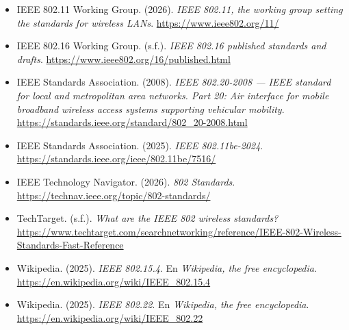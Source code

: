 \documentclass[12pt,letterpaper]{article}
\begin{document}
\begin{itemize}[leftmargin=1.5em,itemsep=8pt]

\item[] IEEE 802.11 Working Group. (2026). \textit{IEEE 802.11, the working group setting the standards for wireless LANs}. \url{https://www.ieee802.org/11/}

\item[] IEEE 802.16 Working Group. (s.f.). \textit{IEEE 802.16 published standards and drafts}. \url{https://www.ieee802.org/16/published.html}

\item[] IEEE Standards Association. (2008). \textit{IEEE 802.20-2008 — IEEE standard for local and metropolitan area networks. Part 20: Air interface for mobile broadband wireless access systems supporting vehicular mobility}. \url{https://standards.ieee.org/standard/802_20-2008.html}

\item[] IEEE Standards Association. (2025). \textit{IEEE 802.11be-2024}. \url{https://standards.ieee.org/ieee/802.11be/7516/}

\item[] IEEE Technology Navigator. (2026). \textit{802 Standards}. \url{https://technav.ieee.org/topic/802-standards/}

\item[] TechTarget. (s.f.). \textit{What are the IEEE 802 wireless standards?} \url{https://www.techtarget.com/searchnetworking/reference/IEEE-802-Wireless-Standards-Fast-Reference}

\item[] Wikipedia. (2025). \textit{IEEE 802.15.4}. En \textit{Wikipedia, the free encyclopedia}. \url{https://en.wikipedia.org/wiki/IEEE_802.15.4}

\item[] Wikipedia. (2025). \textit{IEEE 802.22}. En \textit{Wikipedia, the free encyclopedia}. \url{https://en.wikipedia.org/wiki/IEEE_802.22}

\end{itemize}
\end{document}
